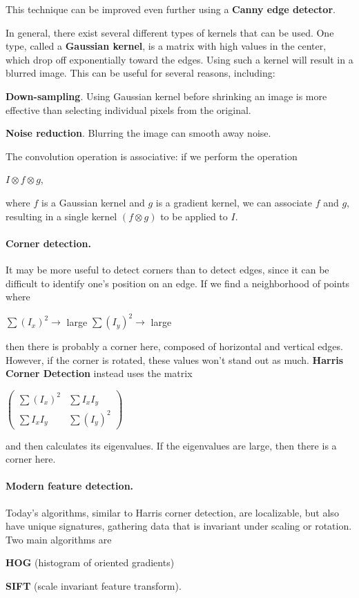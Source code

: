 \documentclass[10pt,a4paper]{article}
\newenvironment{itemize_packed}{
\begin{itemize}
\setlength{\itemsep}{0pt}
\setlength{\parskip}{0pt}
}{\end{itemize}}
\begin{document}
This technique can be improved even further using a \textbf{Canny edge detector}.

In general, there exist several different types of kernels that can be used. One type, called a \textbf{Gaussian kernel}, is a matrix with high values in the center, which drop off exponentially toward the edges. Using such a kernel will result in a blurred image. This can be useful for several reasons, including:
\begin{itemize_packed}
\item \textbf{Down-sampling}. Using Gaussian kernel before shrinking an image is more effective than selecting individual pixels from the original.
\item \textbf{Noise reduction}. Blurring the image can smooth away noise.
\end{itemize_packed}

The convolution operation is associative: if we perform the operation
\begin{center}
$I \otimes f \otimes g$,
\end{center}
where $f$ is a Gaussian kernel and $g$ is a gradient kernel, we can associate $f$ and $g$, resulting in a single kernel $(f\otimes g)$ to be applied to $I$.

\paragraph{Corner detection.} It may be more useful to detect corners than to detect edges, since it can be difficult to identify one's position on an edge. If we find a neighborhood of points where
\begin{center}
$\sum (I_x)^2 \rightarrow$ large
$\sum (I_y)^2 \rightarrow$ large
\end{center}
then there is probably a corner here, composed of horizontal and vertical edges. However, if the corner is rotated, these values won't stand out as much. \textbf{Harris Corner Detection} instead uses the matrix
\begin{center}
$\begin{pmatrix}
\sum (I_x)^2 & \sum I_xI_y \\
\sum I_xI_y & \sum (I_y)^2
\end{pmatrix}$
\end{center}
and then calculates its eigenvalues. If the eigenvalues are large, then there is a corner here.

\paragraph{Modern feature detection.} Today's algorithms, similar to Harris corner detection, are localizable, but also have unique signatures, gathering data that is invariant under scaling or rotation. Two main algorithms are
\begin{itemize_packed}
\item \textbf{HOG} (histogram of oriented gradients)
\item \textbf{SIFT} (scale invariant feature transform).
\end{itemize_packed}
\end{document}
